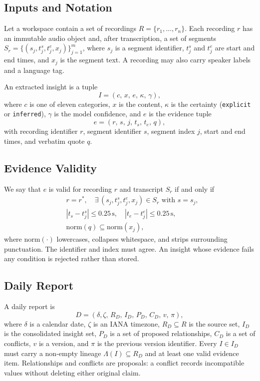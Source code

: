\documentclass[10pt,a4paper]{article}
\newcommand{\code}[1]{\texttt{#1}}
\begin{document}
\subsection{Inputs and Notation}

Let a workspace contain a set of recordings $R=\{r_1,\dots,r_n\}$. Each recording $r$ has
an immutable audio object and, after transcription, a set of segments
$S_r=\{(s_j,t^{s}_j,t^{e}_j,x_j)\}_{j=1}^{m}$, where $s_j$ is a segment identifier,
$t^{s}_j$ and $t^{e}_j$ are start and end times, and $x_j$ is the segment text. A
recording may also carry speaker labels and a language tag.

An extracted insight is a tuple
\begin{equation}
I=(c,\,x,\,e,\,\kappa,\,\gamma),
\end{equation}
where $c$ is one of eleven categories, $x$ is the content, $\kappa$ is the certainty
(\code{explicit} or \code{inferred}), $\gamma$ is the model confidence, and $e$ is the
evidence tuple
\begin{equation}
e=(r,\,s,\,j,\,t_s,\,t_e,\,q),
\end{equation}
with recording identifier $r$, segment identifier $s$, segment index $j$, start and end
times, and verbatim quote $q$.

\subsection{Evidence Validity}

We say that $e$ is valid for recording $r$ and transcript $S_r$ if and only if
\begin{align}
& r = r^{*},\quad \exists\,(s_j,t^{s}_j,t^{e}_j,x_j)\in S_r \text{ with } s=s_j,\\
& |t_s-t^{s}_j|\le 0.25\,\text{s},\quad |t_e-t^{e}_j|\le 0.25\,\text{s},\\
& \mathrm{norm}(q)\subseteq \mathrm{norm}(x_j),
\end{align}
where $\mathrm{norm}(\cdot)$ lowercases, collapses whitespace, and strips surrounding
punctuation. The identifier and index must agree. An insight whose evidence fails any
condition is rejected rather than stored.

\subsection{Daily Report}

A daily report is
\begin{equation}
D=(\delta,\zeta,\,R_D,\,I_D,\,P_D,\,C_D,\,v,\,\pi),
\end{equation}
where $\delta$ is a calendar date, $\zeta$ is an IANA timezone, $R_D\subseteq R$ is the
source set, $I_D$ is the consolidated insight set, $P_D$ is a set of proposed
relationships, $C_D$ is a set of conflicts, $v$ is a version, and $\pi$ is the previous
version identifier. Every $I\in I_D$ must carry a non-empty lineage
$\Lambda(I)\subseteq R_D$ and at least one valid evidence item. Relationships and
conflicts are proposals: a conflict records incompatible values without deleting either
original claim.
\end{document}
